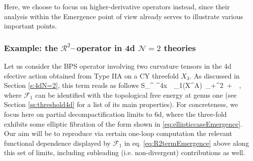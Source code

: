 Here, we choose to focus on higher-derivative operators instead, since their analysis within the Emergence point of view already serves to illustrate various important points.

\subsubsection*{Example: the $\mathcal{R}^2$--\,operator in 4d $\mathcal{N}=2$ theories}


Let us consider the BPS operator involving two curvature tensors in the 4d efective action obtained from Type IIA on a CY threefold $X_3$. As discussed in Section \ref{s:4dN=2}, this term reads as follows
%
\beq
\label{eq:R2termEmergence}
	S_{}^{} \supset \int \dd^4x\, \, _1(X^A)\, _+^2\ +\ \, ,
\eeq
%
where $\mathcal{F}_1$ can be identified with the topological free energy at genus one (see Section \ref{ss:threshold4d} for a list of its main properties). For concreteness, we focus here on partial decompactification limits to 6d, where the three-fold exhibits some elliptic fibration of the form shown in \eqref{eq:ellipticcaseEmergence}. Our aim will be to reproduce via certain one-loop computation the relevant functional dependence displayed by $\mathcal{F}_1$ in eq. \eqref{eq:R2termEmergence} above along this set of limits, including subleading (i.e. non-divergent) contributions as well.

